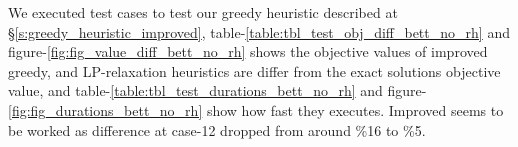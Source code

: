 \documentclass[11pt]{article}
\begin{document}
We executed test cases to test our greedy heuristic described at \S \ref{s:greedy_heuristic_improved}, table-\ref{table:tbl_test_obj_diff_bett_no_rh} and figure-\ref{fig:fig_value_diff_bett_no_rh} shows the objective values of improved greedy, and LP-relaxation heuristics are differ from the exact solutions objective value, and table-\ref{table:tbl_test_durations_bett_no_rh} and figure-\ref{fig:fig_durations_bett_no_rh} show how fast they executes. Improved seems to be worked as difference at case-12 dropped from around \%16 to \%5.



\end{document}
